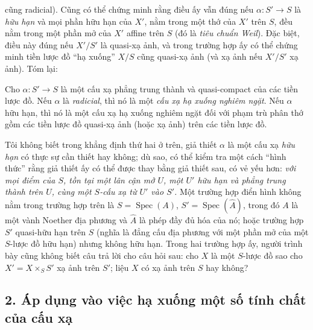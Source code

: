 cũng radicial). Cũng có thể chứng minh rằng điều ấy vẫn đúng nếu
$\alpha:S'\longrightarrow S$ là \emph{hữu hạn} và mọi phần hữu hạn của $X'$,
nằm trong một thớ của $X'$ trên $S$, đều nằm trong một phần mở của $X'$ affine
trên $S$ (đó là \emph{tiêu chuẩn Weil}). Đặc biệt, điều này đúng nếu $X'/S'$ là
quasi-xạ ảnh, và trong trường hợp ấy có thể chứng minh tiền lược đồ ``hạ xuống''
$X/S$ cũng quasi-xạ ảnh (và xạ ảnh nếu $X'/S'$ xạ ảnh). Tóm lại:

 Cho $\alpha:S'\longrightarrow S$ là một cấu xạ phẳng trung
thành và quasi-compact của các tiền lược đồ. Nếu $\alpha$ là \emph{radicial},
thì nó là một \emph{cấu xạ hạ xuống nghiêm ngặt}. Nếu $\alpha$ hữu hạn, thì nó
là một cấu xạ hạ xuống nghiêm ngặt đối với phạm trù phân thớ gồm các tiền lược
đồ quasi-xạ ảnh (hoặc xạ ảnh) trên các tiền lược đồ.

 Tôi không biết trong khẳng định thứ hai ở trên, giả thiết
$\alpha$ là một cấu xạ \emph{hữu hạn} có thực sự cần thiết hay không; dù sao,
có thể kiểm tra một cách ``hình thức'' rằng giả thiết ấy có thể được thay bằng
giả thiết sau, có vẻ yếu hơn: \emph{với mọi điểm của $S$, tồn tại một lân cận
mở $U$, một $U'$ hữu hạn và phẳng trung thành trên $U$, cùng một $S$-cấu xạ từ
$U'$ vào $S'$.} Một trường hợp điển hình không nằm trong trường hợp trên là
$S=\operatorname{Spec}(A)$, $S'=\operatorname{Spec}(\widehat A)$, trong đó $A$
là một vành Noether địa phương và $\widehat A$ là phép đầy đủ hóa của nó; hoặc
trường hợp $S'$ quasi-hữu hạn trên $S$ (nghĩa là đẳng cấu địa phương với một
phần mở của một $S$-lược đồ hữu hạn) nhưng không hữu hạn. Trong hai trường hợp
ấy, người trình bày cũng không biết câu trả lời cho câu hỏi sau: cho $X$ là một
$S$-lược đồ sao cho $X'=X\times_SS'$ xạ ảnh trên $S'$; liệu $X$ có xạ ảnh trên
$S$ hay không?

\subsection*{2. Áp dụng vào việc hạ xuống một số tính chất của cấu xạ}

